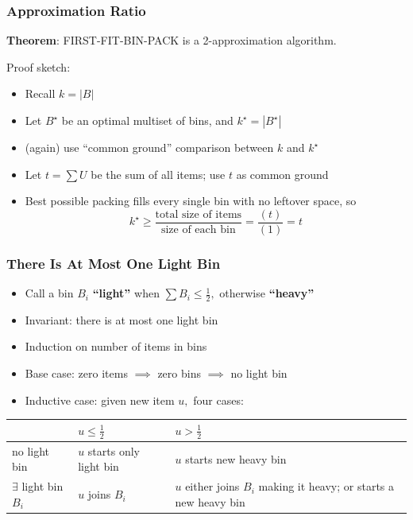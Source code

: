 \documentclass{beamer}
\begin{document}
\begin{frame} \frametitle{Approximation Ratio}
\textbf{Theorem}: FIRST-FIT-BIN-PACK is a 2-approximation algorithm.

Proof sketch:
\begin{itemize}
  \item Recall $k=|B|$
  \item Let $B^\star$ be an optimal multiset of bins, and $k^\star=|B^\star|$
  \item (again) use ``common ground'' comparison between $k$ and $k^\star$
  \item Let $t = \sum U$ be the sum of all items; use $t$ as common ground
  \item Best possible packing fills every single bin with no leftover space, so
    \[ k^\star \geq \frac{\text{total size of items}}{\text{size of each bin}} = \frac{(t)}{(1)} = t \]
\end{itemize}
\end{frame}

\begin{frame} \frametitle{There Is At Most One Light Bin}
  \begin{itemize}
    \item Call a bin $B_i$ \textbf{``light''} when $\sum B_i \leq \frac{1}{2},$ otherwise \textbf{``heavy''}
    \item Invariant: there is at most one light bin
    \item Induction on number of items in bins
    \item Base case: zero items $\implies$ zero bins $\implies$ no light bin
    \item Inductive case: given new item $u,$ four cases:
  \end{itemize}
  \begin{center}
  \begin{tabular}{l | p{1in} | p{1in} }
        & $u \leq \frac{1}{2}$ & $u > \frac{1}{2}$ \\ \hline
        no light bin & $u$ starts only light bin & $u$ starts new heavy bin \\ \hline
        $\exists$ light bin $B_i$ & $u$ joins $B_i$ & $u$ either joins $B_i$ making it heavy; or starts a new heavy bin \\ \hline
  \end{tabular}
  \end{center}
  \end{frame}
    
\end{document}
